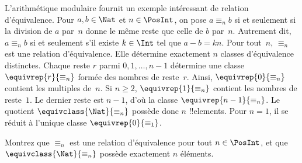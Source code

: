 \documentclass[../../../include/open-logic-section]{subfiles}
\begin{document}
\begin{ex}
L’arithmétique modulaire fournit un exemple intéressant de relation
d’équivalence. Pour $a,b \in \Nat$ et $n \in \PosInt$, on pose
$a \equiv_n b$ si et seulement si la division de $a$ par~$n$
donne le même reste que celle de $b$ par~$n$. Autrement dit,
$a \equiv_n b$ si et seulement s'il existe $k \in \Int$
tel que $a-b=kn$.
Pour tout~$n$, $\equiv_n$ est une relation d'équivalence. Elle détermine
exactement $n$ classes d'équivalence distinctes. Chaque reste
$r$ parmi $0,1,\ldots,n-1$ détermine une classe
$\equivrep{r}{\equiv_n}$ formée des nombres de reste~$r$.
Ainsi, $\equivrep{0}{\equiv_n}$ contient les multiples de~$n$.
Si $n\ge 2$, $\equivrep{1}{\equiv_n}$ contient les nombres de reste~$1$.
Le dernier reste est $n-1$, d'où la classe $\equivrep{n-1}{\equiv_n}$.
Le quotient $\equivclass{\Nat}{\equiv_n}$ possède donc $n$ !!{element}s.
Pour $n=1$, il se réduit à l'unique classe $\equivrep{0}{\equiv_1}$.
%
%
\end{ex}

\begin{prob}
Montrez que $\equiv_n$ est une relation d’équivalence pour tout
$n \in \PosInt$, et que $\equivclass{\Nat}{\equiv_n}$ possède exactement
$n$ éléments.
\end{prob}
\end{document}
